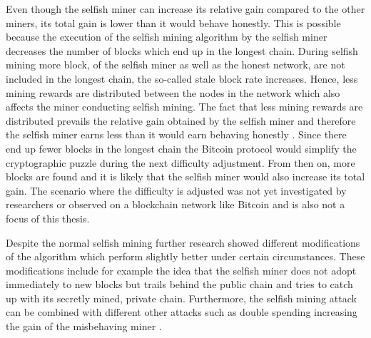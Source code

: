 Even though the selfish miner can increase its relative gain compared to the other miners, its total gain is lower than it would behave honestly.
This is possible because the execution of the selfish mining algorithm by the selfish miner decreases the number of blocks which end up in the longest chain.
During selfish mining more block, of the selfish miner as well as the honest network, are not included in the longest chain, the so-called stale block rate increases.
Hence, less mining rewards are distributed between the nodes in the network which also affects the miner conducting selfish mining.
The fact that less mining rewards are distributed prevails the relative gain obtained by the selfish miner and therefore the selfish miner earns less than it would earn behaving honestly \cite{nayak2016stubborn, sapirshtein2016optimal}.
Since there end up fewer blocks in the longest chain the Bitcoin protocol would simplify the cryptographic puzzle during the next difficulty adjustment.
From then on, more blocks are found and it is likely that the selfish miner would also increase its total gain.
The scenario where the difficulty is adjusted was not yet investigated by researchers or observed on a blockchain network like Bitcoin and is also not a focus of this thesis.

Despite the normal selfish mining further research \cite{nayak2016stubborn,sapirshtein2016optimal, gervais2015tampering, gervais2016security, bahack2013theoretical} showed different modifications of the algorithm which perform slightly better under certain circumstances.
These modifications include for example the idea that the selfish miner does not adopt immediately to new blocks but trails behind the public chain and tries to catch up with its secretly mined, private chain.
Furthermore, the selfish mining attack can be combined with different other attacks such as double spending increasing the gain of the misbehaving miner \cite{gervais2016security, sapirshtein2016optimal, nayak2016stubborn, gervais2015tampering}.

